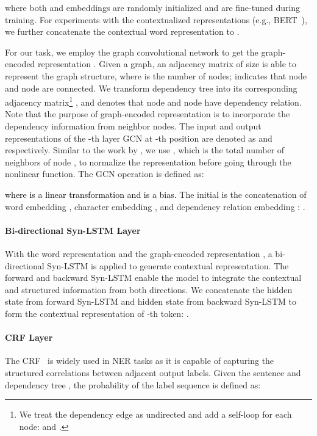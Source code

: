 \documentclass[11pt]{article}
\begin{document}
where both  and  embeddings are randomly initialized and are fine-tuned during training. For experiments with the contextualized representations (e.g., BERT~\cite{devlin2019bert}), we further concatenate the contextual word representation to .


	
For our task, we employ the graph convolutional network \cite{kipf2017semi, zhang2018graph} to get the graph-encoded representation . Given a graph, an adjacency matrix  of size   is able to represent the graph structure, where   is the number of nodes;  indicates that node  and node  are connected. We transform  dependency tree into its corresponding adjacency matrix\footnote{We treat the dependency edge as undirected and add a self-loop for each node:  and .} ,  and  denotes that node  and node  have dependency relation. Note that the purpose of graph-encoded representation  is to incorporate the dependency information from  neighbor nodes. The input and output representations of the -th layer GCN  at -th position are denoted as   and   respectively. Similar to the work by \citet{zhang2018graph}, we  use , which is the total number of  neighbors of node , to normalize the representation before going through the nonlinear function. The GCN operation is defined as:

\textcolor{black}{where  is a linear transformation and  is a bias.}
The initial  is the concatenation of word embedding , character embedding , and dependency relation embedding : .




\paragraph{Bi-directional Syn-LSTM Layer}
With the word representation  and the graph-encoded representation , a bi-directional Syn-LSTM is applied to generate contextual representation. The forward and backward Syn-LSTM enable the model to integrate the contextual and structured  information from both directions. We concatenate the hidden state  from forward Syn-LSTM and hidden state  from backward Syn-LSTM to form the contextual representation of -th token: .




\paragraph{CRF Layer}
The CRF~\cite{lafferty2001conditional} is widely used in NER tasks as it is capable of capturing the structured correlations between adjacent output labels. 
Given the sentence  and dependency tree , the probability of the label sequence  is defined as:
\end{document}
